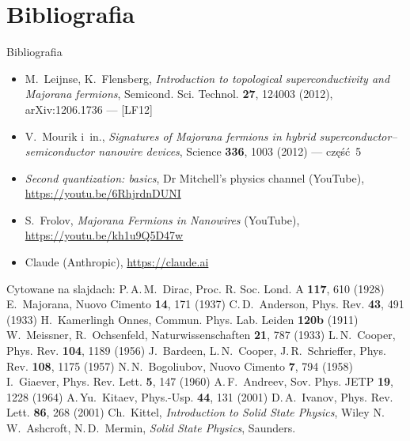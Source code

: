 \documentclass[aspectratio=169,11pt]{beamer}
\newcommand{\LF}{[LF12]}
\begin{document}
\section*{Bibliografia}
\begin{frame}{Bibliografia}
  \fontsize{7.8}{9.6}\selectfont
  \begin{itemize}\setlength{\itemsep}{1.2mm}
    \item[{[1]}] M.~Leijnse, K.~Flensberg, \emph{Introduction to topological superconductivity
          and Majorana fermions}, Semicond. Sci. Technol. \textbf{27}, 124003 (2012), arXiv:1206.1736 — \LF
    \item[{[2]}] V.~Mourik i~in., \emph{Signatures of Majorana fermions in hybrid superconductor–semiconductor
          nanowire devices}, Science \textbf{336}, 1003 (2012) — część~5
    \item[{[3]}] \emph{Second quantization: basics}, Dr Mitchell's physics channel (YouTube),
          \url{https://youtu.be/6RhjrdnDUNI}
    \item[{[4]}] S.~Frolov, \emph{Majorana Fermions in Nanowires} (YouTube),
          \url{https://youtu.be/kh1u9Q5D47w}
    \item[{[5]}] Claude (Anthropic), \url{https://claude.ai}
  \end{itemize}
  \vspace{2mm}
  {\fontsize{6.6}{8.2}\selectfont\color{mGray}
  Cytowane na slajdach:
  P.\,A.\,M.~Dirac, Proc. R. Soc. Lond. A \textbf{117}, 610 (1928) \textperiodcentered{}
  E.~Majorana, Nuovo Cimento \textbf{14}, 171 (1937) \textperiodcentered{}
  C.\,D.~Anderson, Phys. Rev. \textbf{43}, 491 (1933) \textperiodcentered{}
  H.~Kamerlingh Onnes, Commun. Phys. Lab. Leiden \textbf{120b} (1911) \textperiodcentered{}
  W.~Meissner, R.~Ochsenfeld, Naturwissenschaften \textbf{21}, 787 (1933) \textperiodcentered{}
  L.\,N.~Cooper, Phys. Rev. \textbf{104}, 1189 (1956) \textperiodcentered{}
  J.~Bardeen, L.\,N.~Cooper, J.\,R.~Schrieffer, Phys. Rev. \textbf{108}, 1175 (1957) \textperiodcentered{}
  N.\,N.~Bogoliubov, Nuovo Cimento \textbf{7}, 794 (1958) \textperiodcentered{}
  I.~Giaever, Phys. Rev. Lett. \textbf{5}, 147 (1960) \textperiodcentered{}
  A.\,F.~Andreev, Sov. Phys. JETP \textbf{19}, 1228 (1964) \textperiodcentered{}
  A.\,Yu.~Kitaev, Phys.-Usp. \textbf{44}, 131 (2001) \textperiodcentered{}
  D.\,A.~Ivanov, Phys. Rev. Lett. \textbf{86}, 268 (2001) \textperiodcentered{}
  Ch.~Kittel, \emph{Introduction to Solid State Physics}, Wiley \textperiodcentered{}
  N.\,W.~Ashcroft, N.\,D.~Mermin, \emph{Solid State Physics}, Saunders.\par}
\end{frame}
\end{document}
